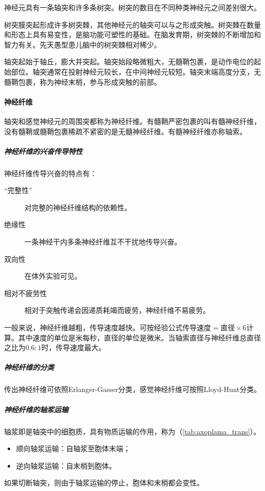 神经元具有一条轴突和许多条树突。树突的数目在不同种类神经元之间差别很大。

树突膜突起形成许多树突棘，其他神经元的轴突可以与之形成突触。树突棘在数量和形态上具有易变性，是脑功能可塑性的基础。在脑发育期，树突棘的不断增加和智力有关。先天愚型患儿脑中的树突棘相对稀少。

轴突起始于轴丘，膨大并突起。轴突始段略微粗大，无髓鞘包裹，是动作电位的起始部位。轴突通常在投射神经元较长，在中间神经元较短。轴突末端高度分支，无髓鞘包裹，称为神经末梢，参与形成突触的前部。

\paragraph{神经纤维}

轴突和感觉神经元的周围突都称为神经纤维。有髓鞘严密包裹的叫有髓神经纤维，没有髓鞘或髓鞘包裹稀疏不紧密的是无髓神经纤维。有髓神经纤维亦称轴索。

\subparagraph{神经纤维的兴奋传导特性}

神经纤维传导兴奋的特点有：
\begin{description}
	\item[“完整性”] 对完整的神经纤维结构的依赖性。
	\item[绝缘性] 一条神经干内多条神经纤维互不干扰地传导兴奋。
	\item[双向性] 在体外实验可见。
	\item[相对不疲劳性] 相对于突触传递会因递质耗竭而疲劳，神经纤维不易疲劳。
\end{description}

一般来说，神经纤维越粗，传导速度越快。可按经验公式$\text{传导速度}=\text{直径}\times 6$计算。其中速度的单位是米每秒，直径的单位是微米。当轴索直径与神经纤维总直径之比为$0.6:1$时，传导速度最大。

\subparagraph{神经纤维的分类}

传出神经纤维可依照Erlanger-Gasser分类，感觉神经纤维可按照Lloyd-Hunt分类。

\subparagraph{神经纤维的轴浆运输}

轴浆即是轴突中的细胞质，具有物质运输的作用，称为（\autoref{tab:axoplama_trans}）。
\begin{itemize}
	\item 顺向轴浆运输：自轴浆至胞体末端；
	\item 逆向轴浆运输：自末梢到胞体。
\end{itemize}

如果切断轴突，则由于轴浆运输的停止，胞体和末梢都会变性。

